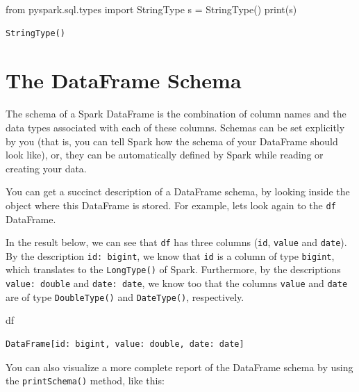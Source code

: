 \documentclass[
  11pt,
  letterpaper,
  DIV=11,
  numbers=noendperiod]{scrreprt}
\newenvironment{Shaded}{\begin{snugshade}}{\end{snugshade}}
\newcommand{\BuiltInTok}[1]{\textcolor[rgb]{0.00,0.23,0.31}{#1}}
\newcommand{\ImportTok}[1]{\textcolor[rgb]{0.00,0.46,0.62}{#1}}
\newcommand{\NormalTok}[1]{\textcolor[rgb]{0.00,0.23,0.31}{#1}}
\newcommand{\OperatorTok}[1]{\textcolor[rgb]{0.37,0.37,0.37}{#1}}
\begin{document}
\begin{Shaded}
\begin{Highlighting}[]
\ImportTok{from}\NormalTok{ pyspark.sql.types }\ImportTok{import}\NormalTok{ StringType}
\NormalTok{s }\OperatorTok{=}\NormalTok{ StringType()}
\BuiltInTok{print}\NormalTok{(s)}
\end{Highlighting}
\end{Shaded}

\begin{verbatim}
StringType()
\end{verbatim}

\hypertarget{the-dataframe-schema}{%
\section{The DataFrame Schema}\label{the-dataframe-schema}}

The schema of a Spark DataFrame is the combination of column names and
the data types associated with each of these columns. Schemas can be set
explicitly by you (that is, you can tell Spark how the schema of your
DataFrame should look like), or, they can be automatically defined by
Spark while reading or creating your data.

You can get a succinct description of a DataFrame schema, by looking
inside the object where this DataFrame is stored. For example, lets look
again to the \texttt{df} DataFrame.

In the result below, we can see that \texttt{df} has three columns
(\texttt{id}, \texttt{value} and \texttt{date}). By the description
\texttt{id:\ bigint}, we know that \texttt{id} is a column of type
\texttt{bigint}, which translates to the \texttt{LongType()} of Spark.
Furthermore, by the descriptions \texttt{value:\ double} and
\texttt{date:\ date}, we know too that the columns \texttt{value} and
\texttt{date} are of type \texttt{DoubleType()} and \texttt{DateType()},
respectively.

\begin{Shaded}
\begin{Highlighting}[]
\NormalTok{df}
\end{Highlighting}
\end{Shaded}

\begin{verbatim}
DataFrame[id: bigint, value: double, date: date]
\end{verbatim}

You can also visualize a more complete report of the DataFrame schema by
using the \texttt{printSchema()} method, like this:
\end{document}
